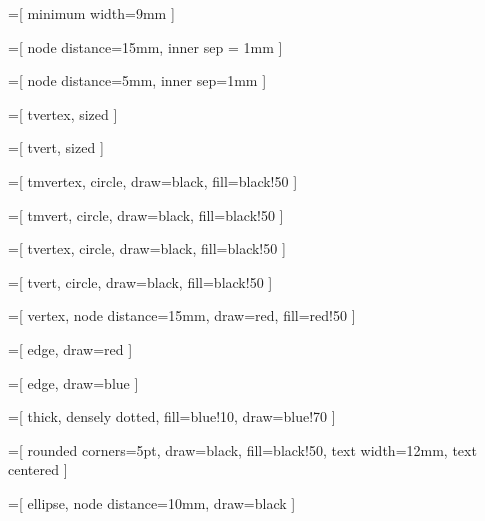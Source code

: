 =[
    minimum width=9mm
]

=[
	node distance=15mm,
    inner sep = 1mm
]

=[
	node distance=5mm,
    inner sep=1mm
]

=[
    tvertex,
    sized
]

=[
    tvert,
    sized
]

=[
    tmvertex,
	circle,
	draw=black,
	fill=black!50
]

=[
    tmvert,
	circle,
	draw=black,
	fill=black!50
]

=[
    tvertex,
	circle,
	draw=black,
	fill=black!50
]

=[
    tvert,
	circle,
	draw=black,
	fill=black!50
]

=[
	vertex,
	node distance=15mm,
	draw=red,
	fill=red!50
]

=[
	edge,
	draw=red
]

=[
	edge,
	draw=blue
]

=[
	thick, %
	densely dotted,
	fill=blue!10,
	draw=blue!70
]

=[
    rounded corners=5pt,
    draw=black,
    fill=black!50,
    text width=12mm,
    text centered
]

=[
    ellipse,
    node distance=10mm,
    draw=black
]
\newcommand{\base}[4]{
    \draw[->] (0,0) to (0, #1);
    \draw[->] (0,0) to (#2, 0);
    
    \node at (0, #1+2) {#3};
    \node at (#2 + 2, -2) {#4};
}


